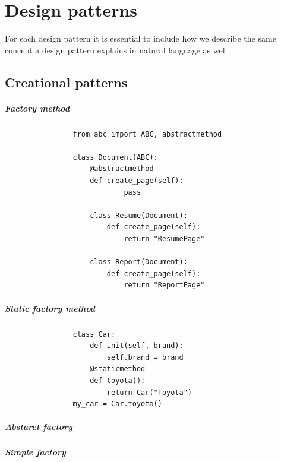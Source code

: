 \chapter{Design patterns}
    For each design pattern it is essential to include how we describe the same concept a design pattern explains in natural language as well
    \section{Creational patterns}
        
        \paragraph{Factory method}
            \begin{verbatim}
                from abc import ABC, abstractmethod
            
                class Document(ABC):
                    @abstractmethod
                    def create_page(self):
                            pass
            
                    class Resume(Document):
                        def create_page(self):
                            return "ResumePage"
            
                    class Report(Document):
                        def create_page(self):
                            return "ReportPage"
            \end{verbatim}
        
        \paragraph{Static factory method}
            
            \begin{verbatim}
                class Car:
                    def init(self, brand):
                        self.brand = brand
                    @staticmethod
                    def toyota():
                        return Car("Toyota")
                my_car = Car.toyota()
            \end{verbatim}
        
        \paragraph{Abstarct factory}
        
        \paragraph{Simple factory}
            
